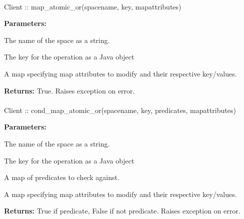 \paragraph{}
\label{api:java:map_atomic_or}
\begin{javacode}
Client :: map_atomic_or(spacename, key, mapattributes)
\end{javacode}


\noindent\textbf{Parameters:}
\begin{description}[labelindent=\widthof{{\code{mapattributes}}},leftmargin=*,noitemsep,nolistsep,align=right]
\item[\code{spacename}] The name of the space as a string.
\item[\code{key}] The key for the operation as a Java object
\item[\code{mapattributes}] A map specifying map attributes to modify and their respective key/values.
\end{description}

\noindent\textbf{Returns:}
True.  Raises exception on error.

\paragraph{}
\label{api:java:cond_map_atomic_or}
\begin{javacode}
Client :: cond_map_atomic_or(spacename, key, predicates, mapattributes)
\end{javacode}


\noindent\textbf{Parameters:}
\begin{description}[labelindent=\widthof{{\code{mapattributes}}},leftmargin=*,noitemsep,nolistsep,align=right]
\item[\code{spacename}] The name of the space as a string.
\item[\code{key}] The key for the operation as a Java object
\item[\code{predicates}] A map of predicates to check against.
\item[\code{mapattributes}] A map specifying map attributes to modify and their respective key/values.
\end{description}

\noindent\textbf{Returns:}
True if predicate, False if not predicate.  Raises exception on error.

